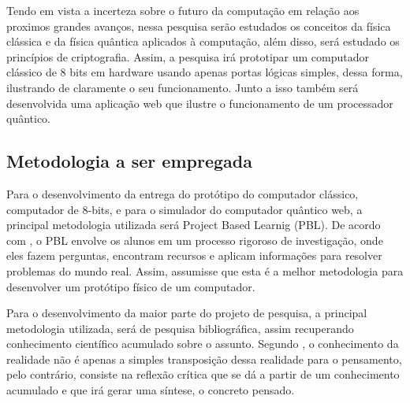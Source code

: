 Tendo em vista a incerteza sobre o futuro da computação em relação aos proximos grandes avanços, nessa pesquisa serão estudados os conceitos da física clássica e da física quântica aplicados à computação, além disso, será estudado os princípios de criptografia. Assim, a pesquisa irá prototipar um computador clássico de 8 bits em hardware usando apenas portas lógicas simples, dessa forma, ilustrando de claramente o seu funcionamento. Junto a isso também será desenvolvida uma aplicação web que ilustre o funcionamento de um processador quântico.

\subsection{Metodologia a ser empregada}
Para o desenvolvimento da entrega do protótipo do computador clássico, computador de 8-bits, e para o simulador do computador quântico web, a principal metodologia utilizada será Project Based Learnig (PBL). De acordo com \cite{GrandRapidsBusinessJournalPBL}, o PBL envolve os alunos em um processo rigoroso de investigação, onde eles fazem perguntas, encontram recursos e aplicam informações para resolver problemas do mundo real. Assim, assumisse que esta é a melhor metodologia para desenvolver um protótipo físico de um computador.

Para o desenvolvimento da maior parte do projeto de pesquisa, a principal metodologia utilizada, será de pesquisa bibliográfica, assim recuperando conhecimento científico acumulado sobre o assunto. Segundo \cite{APesquisaBibliografica}, o conhecimento da realidade não é apenas a simples transposição dessa realidade para o pensamento, pelo contrário, consiste na reflexão crítica que se dá a partir de um conhecimento acumulado e que irá gerar uma síntese, o concreto pensado.
\newpage
